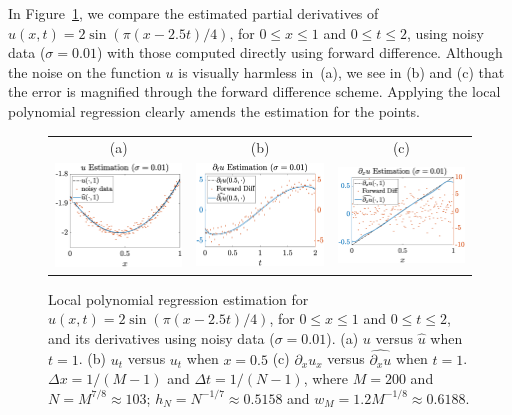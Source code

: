\documentclass[a4paper,11pt]{article}
\theoremstyle{definition}
\begin{document}
In Figure~\ref{fig.derapprox}, we compare the estimated partial derivatives of $u(x,t) = 2\sin(\pi(x-2.5t)/4)$, for $0\leq x\leq 1$ and $0\leq t\leq 2$, using noisy data ($\sigma=0.01$) with those computed directly using forward difference. Although the noise on the function $u$ is visually harmless in~(a), we see in (b) and (c) that the error is magnified through the forward difference scheme. Applying the local polynomial regression clearly amends the estimation for the points.


\begin{figure}
\centering
\begin{tabular}{ccc}
(a)&(b)&(c)\\
\includegraphics[width=2in]{Figures/localpolyExp1_slow.eps}&
\includegraphics[width=2in]{Figures/localpolyExp3_slow.eps}&
\includegraphics[width=2in]{Figures/localpolyExp2_slow.eps}
\end{tabular}
\caption{Local polynomial regression estimation for  $u(x,t) = 2\sin(\pi(x-2.5t)/4)$, for $0\leq x\leq 1$ and $0\leq t\leq 2$, and its derivatives using noisy data ($\sigma=0.01$). (a) $u$ versus $\widehat{u}$ when $t=1$. (b) $u_t$ versus $\widehat{u_t}$ when $x=0.5$ (c) $\partial_xu_x$ versus $\widehat{\partial_xu}$ when $t=1$.  $\Delta x=1/(M-1)$ and $\Delta t = 1/(N-1)$, where $M=200$ and $N=M^{7/8}\approx103$; $h_N=N^{-1/7}\approx0.5158$ and $w_M=1.2M^{-1/8}\approx0.6188$.  %
}\label{fig.derapprox}	
\end{figure}
\end{document}
